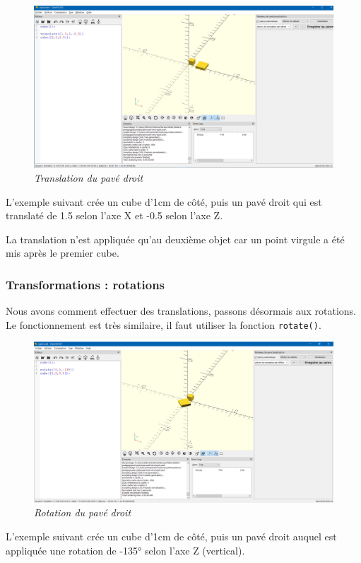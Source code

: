 \begin{figure}[ht]
	\centering
	\includegraphics[width=12cm]{images/translate}
	\caption{\textit{Translation du pavé droit}}
\end{figure}

L'exemple suivant crée un cube d'1cm de côté, puis un pavé droit qui est translaté de 1.5 selon l'axe X et -0.5 selon l'axe Z.

La translation n'est appliquée qu'au deuxième objet car un point virgule a été mis après le premier cube.


\subsubsection{Transformations : rotations}

Nous avons comment effectuer des translations, passons désormais aux rotations.
Le fonctionnement est très similaire, il faut utiliser la fonction \verb|rotate()|.

\vspace{12pt}

\begin{figure}[ht]
	\centering
	\includegraphics[width=12cm]{images/rotate}
	\caption{\textit{Rotation du pavé droit}}
\end{figure}

L'exemple suivant crée un cube d'1cm de côté, puis un pavé droit auquel est appliquée une rotation de -135° selon l'axe Z (vertical).